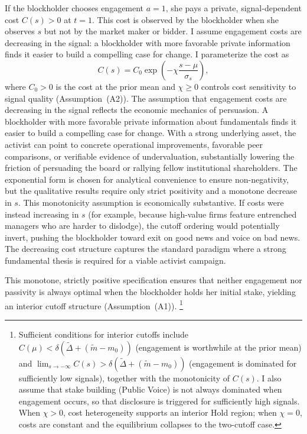 \documentclass[11pt]{article}
\newcommand{\1}{\mathbf{1}}
\begin{document}
If the blockholder chooses engagement $a = 1$, she pays a private, signal-dependent cost $C(s) > 0$ at $t = 1$. This cost is observed by the blockholder when she observes $s$ but not by the market maker or bidder. I assume engagement costs are decreasing in the signal: a blockholder with more favorable private information finds it easier to build a compelling case for change. I parameterize the cost as
\[
C(s) = C_0 \exp\!\left(-\chi \frac{s - \mu}{\sigma_s}\right),
\]
where $C_0 > 0$ is the cost at the prior mean and $\chi \geq 0$ controls cost sensitivity to signal quality (Assumption~\textup{(A2)}). The assumption that engagement costs are decreasing in the signal reflects the economic mechanics of persuasion. A blockholder with more favorable private information about fundamentals finds it easier to build a compelling case for change. With a strong underlying asset, the activist can point to concrete operational improvements, favorable peer comparisons, or verifiable evidence of undervaluation, substantially lowering the friction of persuading the board or rallying fellow institutional shareholders. The exponential form is chosen for analytical convenience to ensure non-negativity, but the qualitative results require only strict positivity and a monotone decrease in $s$. This monotonicity assumption is economically substantive. If costs were instead increasing in $s$ (for example, because high-value firms feature entrenched managers who are harder to dislodge), the cutoff ordering would potentially invert, pushing the blockholder toward exit on good news and voice on bad news. The decreasing cost structure captures the standard paradigm where a strong fundamental thesis is required for a viable activist campaign.

This monotone, strictly positive specification ensures that neither engagement nor passivity is always optimal when the blockholder holds her initial stake, yielding an interior cutoff structure (Assumption~\textup{(A1)}).%
\footnote{Sufficient conditions for interior cutoffs include $C(\mu) < \delta(\tilde{\Delta} + (\tilde{m}-m_0))$ (engagement is worthwhile at the prior mean) and $\lim_{s\to-\infty} C(s) > \delta(\tilde{\Delta} + (\tilde{m}-m_0))$ (engagement is dominated for sufficiently low signals), together with the monotonicity of $C(s)$. I also assume that stake building (Public Voice) is not always dominated when engagement occurs, so that disclosure is triggered for sufficiently high signals. When $\chi > 0$, cost heterogeneity supports an interior Hold region; when $\chi = 0$, costs are constant and the equilibrium collapses to the two-cutoff case.}
\end{document}
